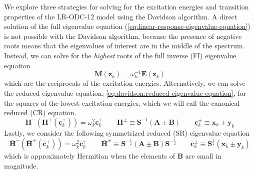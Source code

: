 We explore three strategies for solving for the excitation energies and
transition properties of the LR-ODC-12 model using the Davidson algorithm.
A direct solution of the full eigenvalue equation
(\cref{eq:linear-response-eigenvalue-equation}) is not possible with the
Davidson algorithm, because the presence of negative roots means that the
eigenvalues of interest are in the middle of the spectrum.
Instead, we can solve for the {\itshape highest} roots of the full inverse (FI)
eigenvalue equation
\begin{equation}
    \mathbf{M}(\mathbf{z}_k)
    =
    \omega_k^{-1}
    \mathbf{E}(\mathbf{z}_k)
\end{equation}
which are the reciprocals of the excitation energies.
Alternatively, we can solve the reduced eigenvalue equation,
\cref{eq:davidson:reduced-eigenvalue-equation}, for the squares of the lowest
excitation energies, which we will call the canonical reduced (CR) equation.
\begin{equation}
    \mathbf{H}^-(\mathbf{H}^+(\mathbf{c}_k^+))
    =
    \omega_k^2
    \mathbf{c}_k^+
    \qquad
    \mathbf{H}^{\pm}
    \equiv
    \mathbf{S}^{-1}
    (
        \mathbf{A} \pm \mathbf{B}
    )
    \qquad
    \mathbf{c}_k^{\pm}
    \equiv
    \mathbf{x}_k \pm \mathbf{y}_k
\end{equation}
Lastly, we consider the following symmetrized reduced (SR) eigenvalue equation
\begin{equation}
    \bar{\mathbf{H}}^-(\bar{\mathbf{H}}^+(\bar{\mathbf{c}}_k^+))
    =
    \omega_k^2
    \bar{\mathbf{c}}_k^+
    \qquad
    \bar{\mathbf{H}}^{\pm}
    \equiv
    \mathbf{S}^{-\frac{1}{2}}
    (
        \mathbf{A} \pm \mathbf{B}
    )
    \mathbf{S}^{-\frac{1}{2}}
    \qquad
    \bar{\mathbf{c}}_k^{\pm}
    \equiv
    \mathbf{S}^{\frac{1}{2}}
    (\mathbf{x}_k \pm \mathbf{y}_k)
\end{equation}
which is approximately Hermitian when the elements of
\(
    \mathbf{B}
\)
are small in magnitude.

